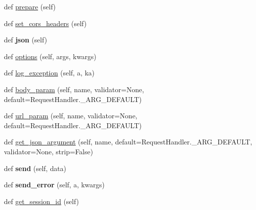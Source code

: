 \begin{DoxyCompactItemize}
\item 
def \hyperlink{classrap_1_1utils_1_1tornado__middleware_1_1BaseHandler_a1b0cf12dd9dc5b4bd279dc3ba4fd52b4}{prepare} (self)
\item 
def \hyperlink{classrap_1_1utils_1_1tornado__middleware_1_1BaseHandler_a6e019fb084d0e4ee23223aa686aea828}{set\+\_\+cors\+\_\+headers} (self)
\item 
\mbox{\label{classrap_1_1utils_1_1tornado__middleware_1_1BaseHandler_a2ed46a37ffd161af451c875419ac9658}} 
def {\bfseries json} (self)
\item 
def \hyperlink{classrap_1_1utils_1_1tornado__middleware_1_1BaseHandler_a3dde4500ab26b4c0f085b0f0f87aeb00}{options} (self, args, kwargs)
\item 
def \hyperlink{classrap_1_1utils_1_1tornado__middleware_1_1BaseHandler_a4cc8a59625046421d72fc26ebdc48b8b}{log\+\_\+exception} (self, a, ka)
\item 
def \hyperlink{classrap_1_1utils_1_1tornado__middleware_1_1BaseHandler_a76286f218f84bbe922514a47ff260fd3}{body\+\_\+param} (self, name, validator=None, default=Request\+Handler.\+\_\+\+A\+R\+G\+\_\+\+D\+E\+F\+A\+U\+LT)
\item 
def \hyperlink{classrap_1_1utils_1_1tornado__middleware_1_1BaseHandler_a495f14b154569847485a50896cbeba96}{url\+\_\+param} (self, name, validator=None, default=Request\+Handler.\+\_\+\+A\+R\+G\+\_\+\+D\+E\+F\+A\+U\+LT)
\item 
def \hyperlink{classrap_1_1utils_1_1tornado__middleware_1_1BaseHandler_ac0c6d9cbed335d63538233bafce9be22}{get\+\_\+json\+\_\+argument} (self, name, default=Request\+Handler.\+\_\+\+A\+R\+G\+\_\+\+D\+E\+F\+A\+U\+LT, validator=None, strip=False)
\item 
\mbox{\label{classrap_1_1utils_1_1tornado__middleware_1_1BaseHandler_a8a9b4323944670a6a47a2be1b570d02f}} 
def {\bfseries send} (self, data)
\item 
\mbox{\label{classrap_1_1utils_1_1tornado__middleware_1_1BaseHandler_a818eceec38bdb43eccd83d7df4e1ea39}} 
def {\bfseries send\+\_\+error} (self, a, kwargs)
\item 
def \hyperlink{classrap_1_1utils_1_1tornado__middleware_1_1BaseHandler_a03bc92f627012cebf7c9dacbeb958e14}{get\+\_\+session\+\_\+id} (self)
\end{DoxyCompactItemize}


